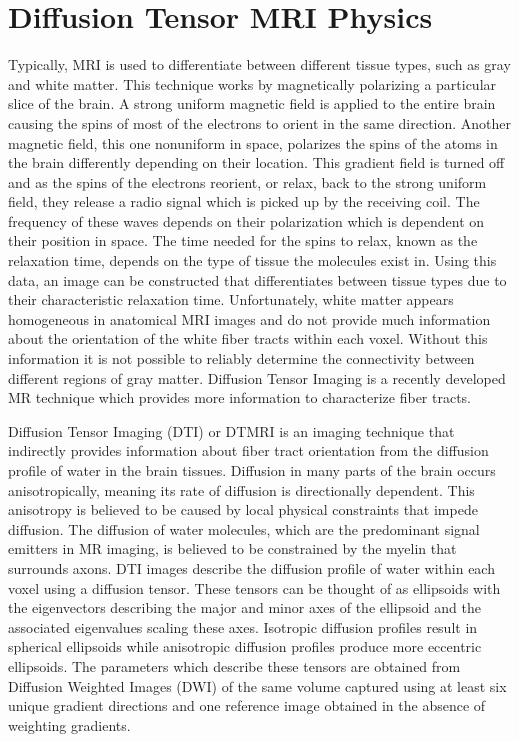 \section{Diffusion Tensor MRI Physics}

Typically, MRI is used to differentiate between different tissue types, such as gray and white matter.  This technique works by magnetically polarizing a particular slice of the brain.  A strong uniform magnetic field is applied to the entire brain causing the spins of most of the electrons to orient in the same direction.  Another magnetic field, this one nonuniform in space, polarizes the spins of the atoms in the brain differently depending on their location.  This gradient field is turned off and as the spins of the electrons reorient, or relax, back to the strong uniform field, they release a radio signal which is picked up by the receiving coil.  The frequency of these waves depends on their polarization which is dependent on their position in space.  The time needed for the spins to relax, known as the relaxation time, depends on the type of tissue the molecules exist in.  Using this data, an image can be constructed that differentiates between tissue types due to their characteristic relaxation time. Unfortunately, white matter appears homogeneous in anatomical MRI images and do not provide much information about the orientation of the white fiber tracts within each voxel.  Without this information it is not possible to reliably determine the connectivity between different regions of gray matter.  Diffusion Tensor Imaging is a recently developed MR technique which provides more information to characterize fiber tracts.

Diffusion Tensor Imaging (DTI) or DTMRI is an imaging technique that indirectly provides information about fiber tract orientation from the diffusion profile of water in the brain tissues. Diffusion in many parts of the brain occurs anisotropically, meaning its rate of diffusion is directionally dependent.  This anisotropy is believed to be caused by local physical constraints that impede diffusion.  The diffusion of water molecules, which are the predominant signal emitters in MR imaging, is believed to be constrained by the myelin that surrounds axons.  DTI images describe the diffusion profile of water within each voxel using a diffusion tensor.  These tensors can be thought of as ellipsoids with the eigenvectors describing the major and minor axes of the ellipsoid and the associated eigenvalues scaling these axes.  Isotropic diffusion profiles result in spherical ellipsoids while anisotropic diffusion profiles produce more eccentric ellipsoids.  The parameters which describe these tensors are obtained from Diffusion Weighted Images (DWI) of the same volume captured using at least six unique gradient directions and one reference image obtained in the absence of weighting gradients.

